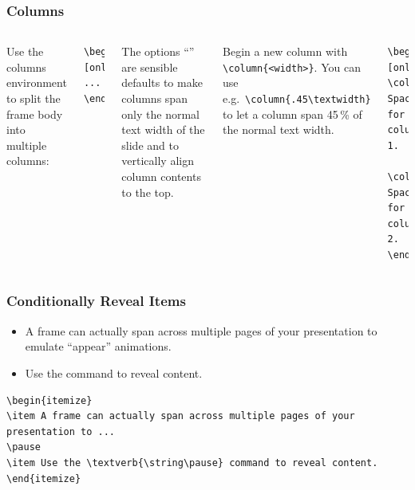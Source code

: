 \documentclass[utf8,aspectratio=169,ngerman,english]{beamer}
\begin{document}
\begin{frame}[containsverbatim]
\frametitle{Columns}

\begin{columns}[onlytextwidth,T]

Use the columns environment to split the frame body into multiple columns:
\begin{lstlisting}[language={[LaTeX]TeX},numbers=none]
\begin{columns}[onlytextwidth,T]
...
\end{columns}
\end{lstlisting}
The options ``'' are sensible defaults to make columns span only the normal text width of the slide and to vertically align column contents to the top.

Begin a new column with \verb|\column{<width>}|. You can use e.g.\ \verb|\column{.45\textwidth}| to let a column span 45\,\% of the normal text width.
\begin{lstlisting}[language={[LaTeX]TeX},numbers=none]
\begin{columns}[onlytextwidth,T]
\column{.45\textwidth}
Space for column 1.

\column{.50\textwidth}
Space for column 2.
\end{columns}
\end{lstlisting}

\end{columns}
\end{frame}


\begin{frame}[fragile]
\frametitle{Conditionally Reveal Items}

\begin{itemize}
\item A frame can actually span across multiple pages of your presentation to emulate ``appear'' animations.
\pause
\item Use the \textverb{\string\pause} command to reveal content.
\end{itemize}

\bigskip
\begin{lstlisting}[language={[LaTeX]TeX},numbers=none]
\begin{itemize}
\item A frame can actually span across multiple pages of your presentation to ...
\pause
\item Use the \textverb{\string\pause} command to reveal content.
\end{itemize}
\end{lstlisting}
\end{frame}
\end{document}
